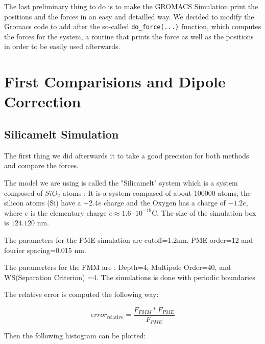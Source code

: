 \documentclass[12pt,twoside,a4paper]{report}
\begin{document}
The last preliminary thing to do is to make the GROMACS Simulation print the positions and the forces in an easy and detailled way. We decided to modify the Gromacs code to add after the so-called {\tt{do\_force(...)}} function, which computes the forces for the system, a routine that prints the force as well as the positions in order to be
 easily used afterwards. 

\section{First Comparisions and Dipole Correction}

\subsection{Silicamelt Simulation}

The first thing we did afterwards it to take a good precision for both methods and compare the forces.

The model we are using is called the "Silicamelt" system which is a system composed of $SiO_2$ atoms : It is a system compased of about 100000 atoms, the silicon atoms (Si) have a $+2.4e$ charge and the Oxygen has a charge of $-1.2e$, where $e$ is the elementary charge $e \approx 1.6\cdot10^{-19} \text{C}$.
The size of the simulation box is $124.120$ nm.

The parameters for the PME simulation are cutoff=1.2nm, PME order=12 and fourier spacing=0.015 nm. 

The paramerters for the FMM are : Depth=4, Multipole Order=40, and WS(Separation Criterion) =4. The simulations is done with periodic boundaries 

The relative error is computed the following way:

\begin{equation}
	error_{\text{relative}} = \frac{F_{FMM} * F_{PME}}{F_{PME}}
\end{equation}

Then the following histogram can be plotted:
\end{document}
